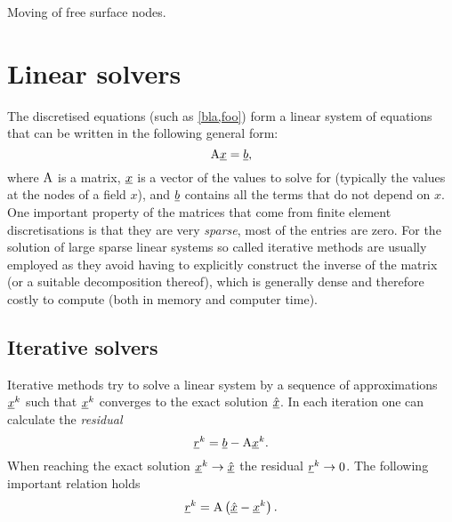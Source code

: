 Moving of free surface nodes.

\section{Linear solvers} \label{ND_Linear_solvers}
The discretised equations (such as \eqref{bla,foo}) form 
a linear system of equations that can be written 
in the following general form:
\begin{equation*}
  \mathrm{A}\underline{x}=\underline{b},
\end{equation*}
where $\mathrm{A}$ is a matrix, $\underline{x}$ is a vector of the values 
to solve for (typically the values at the nodes of a field $x$), 
and $\underline{b}$ contains all the terms that do not depend on 
$x$. One important property of the matrices that come from 
finite element discretisations is that they are very \emph{sparse}, 
\ie most of the entries are zero. For the solution of large
sparse linear systems so called iterative methods are usually employed
as they 
avoid having to explicitly construct the inverse of the matrix
(or a suitable decomposition thereof), 
which is generally dense and therefore costly to compute 
(both in memory and computer time).

\subsection{Iterative solvers}
Iterative methods try to solve a linear system by a sequence 
of approximations $\underline{x}^k$ such that $\underline{x}^k$ converges to
the exact solution $\underline{\hat x}$. In each iteration one can 
calculate the \emph{residual}
\begin{equation*}
  \underline{r}^k = \underline{b} - \mathrm{A}\underline{x}^k.
\end{equation*}
When reaching the exact solution $\underline{x}^k\to\underline{\hat x}$ the 
residual $\underline{r}^k\to 0$. The following important relation holds
\begin{equation}\label{eq:residual_error}
  \underline{r}^k = \mathrm{A}\left( \underline{\hat x} - \underline{x}^k \right).
\end{equation}

